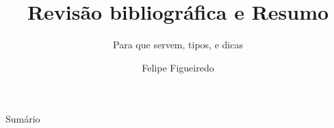 \documentclass{beamer}
\title%
{Revisão bibliográfica e Resumo}
\subtitle
{Para que servem, tipos, e dicas} %
\author%
{Felipe Figueiredo}%
\institute[INTO] %
{Instituto Nacional de Traumatologia e Ortopedia
}
\date%
{}
\begin{document}
\begin{frame}
  \titlepage
\end{frame}

\begin{frame}{Sumário}
  \tableofcontents
\end{frame}








\end{document}

